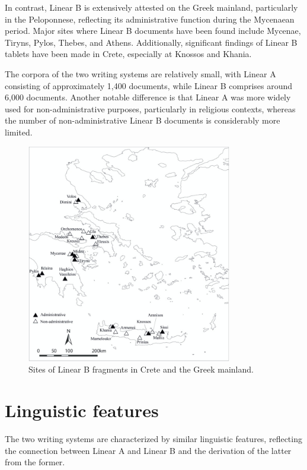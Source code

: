 In contrast, Linear B is extensively attested on the Greek mainland, particularly in the Peloponnese, reflecting its administrative function during the Mycenaean period.
Major sites where Linear B documents have been found include Mycenae, Tiryns, Pylos, Thebes, and Athens.
Additionally, significant findings of Linear B tablets have been made in Crete, especially at Knossos and Khania.

The corpora of the two writing systems are relatively small, with Linear A consisting of approximately 1,400 documents, while Linear B comprises around 6,000 documents.
Another notable difference is that Linear A was more widely used for non-administrative purposes, particularly in religious contexts, whereas the number of non-administrative Linear B documents is considerably more limited. \cite{salg-ch1}


\begin{figure}[H]
    \centering
    \includegraphics[width=0.8\textwidth]{Images/mainland_LB.jpg} %
    \caption{Sites of Linear B fragments in Crete and the Greek mainland. \protect\footnotemark}
    \label{fig:mainland_LB}
\end{figure}


\section{Linguistic features}
The two writing systems are characterized by similar linguistic features, reflecting the connection between Linear A and Linear B and the derivation of the latter from the former.

